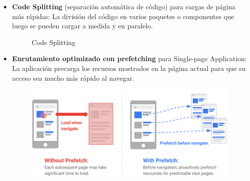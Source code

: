 \documentclass[12pt,twoside,titlepage]{report}
\begin{document}
\begin{itemize}
    \item \textbf{Code Splitting} (separación automática de código) para cargas de página más rápidas: La división del código en varios paquetes o componentes que luego se pueden cargar a medida y en paralelo.
        \begin{figure}[H]
            \centering
            \caption{Code Splitting}
            \label{f:codesplit}
        \end{figure}
    \item \textbf{Enrutamiento optimizado con prefetching} para Single-page Application: La aplicación precarga los recursos mostrados en la página actual para que su acceso sea mucho más rápido al navegar.
        \begin{figure}[H]
            \centering
            \includegraphics[scale=0.3]{Nextjs/Prefetch}

\end{figure}
\end{itemize}
\end{document}

